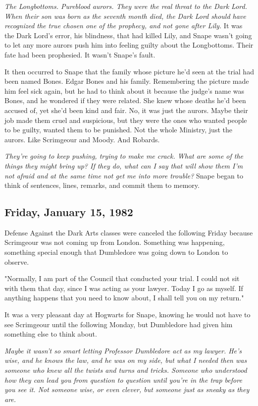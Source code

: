 \emph{The Longbottoms. Pureblood aurors. They were the real threat to the Dark Lord. When their son was born as the seventh month died, the Dark Lord should have recognized the true chosen one of the prophecy, and not gone after Lily.} It was the Dark Lord's error, his blindness, that had killed Lily, and Snape wasn't going to let any more aurors push him into feeling guilty about the Longbottoms. Their fate had been prophesied. It wasn't Snape's fault.

It then occurred to Snape that the family whose picture he'd seen at the trial had been named Bones. Edgar Bones and his family. Remembering the picture made him feel sick again, but he had to think about it because the judge's name was Bones, and he wondered if they were related. She knew whose deaths he'd been accused of, yet she'd been kind and fair. No, it was just the aurors. Maybe their job made them cruel and suspicious, but they were the ones who wanted people to be guilty, wanted them to be punished. Not the whole Ministry, just the aurors. Like Scrimgeour and Moody. And Robards.

\emph{They're going to keep pushing, trying to make me crack. What are some of the things they might bring up? If they do, what can I say that will show them I'm not afraid and at the same time not get me into more trouble?} Snape began to think of sentences, lines, remarks, and commit them to memory.

\subsection{Friday, January 15, 1982}

Defense Against the Dark Arts classes were canceled the following Friday because Scrimgeour was not coming up from London. Something was happening, something special enough that Dumbledore was going down to London to observe.

"Normally, I am part of the Council that conducted your trial. I could not sit with them that day, since I was acting as your lawyer. Today I go as myself. If anything happens that you need to know about, I shall tell you on my return."

It was a very pleasant day at Hogwarts for Snape, knowing he would not have to see Scrimgeour until the following Monday, but Dumbledore had given him something else to think about.

\emph{Maybe it wasn't so smart letting Professor Dumbledore act as my lawyer. He's wise, and he knows the law, and he was on my side, but what I needed then was someone who knew all the twists and turns and tricks. Someone who understood how they can lead you from question to question until you're in the trap before you see it. Not someone wise, or even clever, but someone just as sneaky as they are.}

